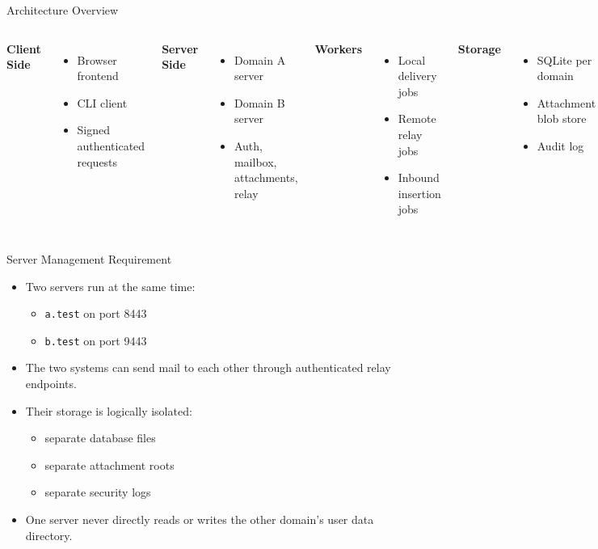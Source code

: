 \documentclass[aspectratio=169]{beamer}
\begin{document}
\begin{frame}{Architecture Overview}
  \begin{columns}[T]
    \textbf{Client Side}
    \begin{itemize}
      \item Browser frontend
      \item CLI client
      \item Signed authenticated requests
    \end{itemize}

    \textbf{Server Side}
    \begin{itemize}
      \item Domain A server
      \item Domain B server
      \item Auth, mailbox, attachments, relay
    \end{itemize}

    \textbf{Workers}
    \begin{itemize}
      \item Local delivery jobs
      \item Remote relay jobs
      \item Inbound insertion jobs
    \end{itemize}

    \textbf{Storage}
    \begin{itemize}
      \item SQLite per domain
      \item Attachment blob store
      \item Audit log
    \end{itemize}
  \end{columns}
\end{frame}

\begin{frame}{Server Management Requirement}
  \begin{itemize}
    \item Two servers run at the same time:
    \begin{itemize}
      \item \texttt{a.test} on port 8443
      \item \texttt{b.test} on port 9443
    \end{itemize}
    \item The two systems can send mail to each other through authenticated relay endpoints.
    \item Their storage is logically isolated:
    \begin{itemize}
      \item separate database files
      \item separate attachment roots
      \item separate security logs
    \end{itemize}
    \item One server never directly reads or writes the other domain's user data directory.
  \end{itemize}
\end{frame}
\end{document}
